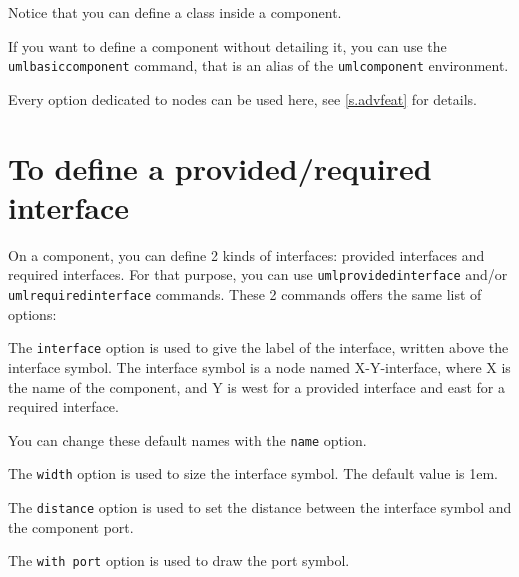 \documentclass[a4paper,11pt]{report}
\begin{document}
\medskip

Notice that you can define a class inside a component.

\medskip

If you want to define a component without detailing it, you can use the {\tt umlbasiccomponent} command, that is an alias of the {\tt umlcomponent} environment.

\medskip

Every \TikZ{} option dedicated to nodes can be used here, see \autoref{s.advfeat} for details.

\section{To define a provided/required interface}

On a component, you can define 2 kinds of interfaces: provided interfaces and required interfaces. For that purpose, you can use {\tt umlprovidedinterface} and/or {\tt umlrequiredinterface} commands.
These 2 commands offers the same list of options:

\medskip

\begin{minipage}{0.45\textwidth}
	
\end{minipage}
\begin{minipage}{0.55\textwidth}
	\begin{center}
	\end{center}
\end{minipage}

\medskip

The {\tt interface} option is used to give the label of the interface, written above the interface symbol.
The interface symbol is a node named X-Y-interface, where X is the name of the component, and Y is west for a provided interface and east for a required interface.

You can change these default names with the {\tt name} option.

\medskip

The {\tt width} option is used to size the interface symbol. The default value is 1em.

\medskip

The {\tt distance} option is used to set the distance between the interface symbol and the component port.

\medskip

The {\tt with port} option is used to draw the port symbol.
\end{document}
